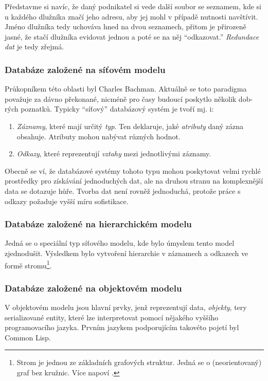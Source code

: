 Představme si navíc, že daný podnikatel si vede další soubor se seznamem, kde si u každého dlužníka značí jeho adresu, aby jej mohl v případě nutnosti navštívit. Jméno dlužníka tedy uchováva hned na dvou seznamech, přitom je přirozeně jasné, že stačí dlužníka evidovat jednou a poté se na něj \enquote{odkazovat.} \textit{Redundace dat} je tedy zřejmá.

\subsubsection{Databáze založené na síťovém modelu}
Průkopníkem této oblasti byl Charles Bachman. Aktuálně se toto paradigma považuje za dávno překonané, nicméně pro časy budoucí poskytlo několik dob-rých poznatků. Typicky \enquote{síťový} databázový systém je tvoří mj. i:
\begin{enumerate}
\item \textit{Záznamy}, které mají určitý \textit{typ}. Ten deklaruje, jaké \textit{atributy} daný zázna obsahuje. Atributy mohou nabývat různých hodnot.
\item \textit{Odkazy}, které reprezentují \textit{vztahy} mezi jednotlivými záznamy.
\end{enumerate}
Obecně se ví, že databázové systémy tohoto typu mohou poskytovat velmi rychlé prostředky pro získávání jednoduchých dat, ale na druhou stranu na komplexnější data se dotazuje hůře. Tvorba dat není rovněž jednoduchá, protože práce s odkazy požaduje vyšší míru sofistikace.


\subsubsection{Databáze založené na hierarchickém modelu}
Jedná se o speciální typ síťového modelu, kde bylo úmyslem tento model zjednodušit. Výsledkem bylo vytvoření hierarchie v záznamech a odkazech ve formě stromu\footnote{Strom je jednou ze základních grafových struktur. Jedná se o (neorientovaný) graf bez kružnic. Více napoví \citep[str. 91 -- 96]{cormen:algorithms}.}.

\subsubsection{Databáze založené na objektovém modelu}
V objektovém modelu jsou hlavní prvky, jenž reprezentují data, \textit{objekty}, tery serializované entity, které lze interpretovat pomocí nějakého vyššího programovacího jazyka. Prvním jazykem podporujícím takovéto pojetí byl Common Lisp.

